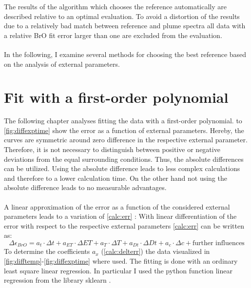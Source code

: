 \documentclass  [
  paper    = a4,
  BCOR     = 10mm,
  twoside,
  fontsize = 12pt,
  fleqn,
  toc      = bibnumbered,
  toc      = listofnumbered,
  numbers  = noendperiod,
  headings = normal,
  listof   = leveldown,
  version  = 3.03
]                                       {scrreprt}
\begin{document}
%
The results of the algorithm which chooses the reference automatically are described relative to an optimal evaluation. To avoid a distortion of the results due to a relatively bad match between reference and plume spectra all data with a relative BrO fit error larger than one are excluded from the evaluation.\\
\\
In the following, I examine several methods for choosing the best reference based on the analysis of external parameters. 

\section{Fit with a first-order polynomial}
The following chapter analyses fitting the data with a first-order polynomial.  to \cref{fig:diffexptime} show the   error as a function of external parameters. Hereby, the curves are symmetric around zero difference in the respective external parameter. Therefore, it is not necessary to distinguish between positive or negative deviations from the equal surrounding conditions. Thus, the absolute differences can be utilized. Using the absolute difference leads to less complex calculations and therefore to a lower calculation time. On the other hand not using the absolute difference leads to no measurable advantages. \\
\\
%
A linear approximation of the   error as a function of the considered external parameters leads to a variation of  \cref{calc:err} :
With linear differentiation of the   error with respect to the respective external parameters \cref{calc:err} can be written as:    
\begin{equation}
\Delta \epsilon_{BrO} = a_{t}\cdot\Delta t+a_{ET}\cdot\Delta ET+a_{T}\cdot\Delta T+a_{Dt}\cdot\Delta Dt +a_{c}\cdot\Delta c + \text{further influences}
\label{calc:delterr}
\end{equation}
%
To determine the coefficients $a_{x}$ (\cref{calc:delterr}) the data visualized in \cref{fig:difftemp}-\ref{fig:diffexptime} where used.  The fitting is done with an ordinary least square linear regression. In particular I used the python function linear regression from the library sklearn \citep{SKlearn}. \\
\end{document}
